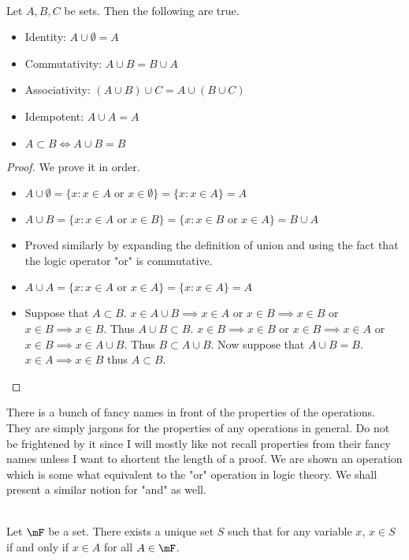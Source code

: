 \documentclass[a4paper]{article}
\begin{document}
\begin{lmm}{}{}\\
Let $A,B,C$ be sets. Then the following are true. 
\begin{itemize}
\item Identity: $A\cup\emptyset=A$
\item Commutativity: $A\cup B=B\cup A$
\item Associativity: $(A\cup B)\cup C=A\cup(B\cup C)$
\item Idempotent: $A\cup A=A$
\item $A\subset B\iff A\cup B=B$
\end{itemize}
\begin{proof} We prove it in order. 
\begin{itemize}
\item $A\cup\emptyset=\{x:x\in A\text{ or }x\in\emptyset\}=\{x:x\in A\}=A$
\item $A\cup B=\{x:x\in A\text{ or }x\in B\}=\{x:x\in B\text{ or }x\in A\}=B\cup A$
\item Proved similarly by expanding the definition of union and using the fact that the logic operator "or" is commutative. 
\item $A\cup A=\{x:x\in A\text{ or }x\in A\}=\{x:x\in A\}=A$
\item Suppose that $A\subset B$. $x\in A\cup B\implies x\in A$ or $x\in B\implies x\in B$ or $x\in B\implies x\in B$. Thus $A\cup B\subset B$. $x\in B\implies x\in B$ or $x\in B\implies x\in A$ or $x\in B\implies x\in A\cup B$. Thus $B\subset A\cup B$. Now suppose that $A\cup B=B$. $x\in A\implies x\in B$ thus $A\subset B$. 
\end{itemize}
\end{proof}
\end{lmm}

There is a bunch of fancy names in front of the properties of the operations. They are simply jargons for the properties of any operations in general. Do not be frightened by it since I will mostly like not recall properties from their fancy names unless I want to shortent the length of a proof. \linebreak\linebreak
We are shown an operation which is some what equivalent to the "or" operation in logic theory. We shall present a similar notion for "and" as well. 

\begin{prp}{}{}\\
Let $\mF$ be a set. There exists a unique set $S$ such that for any variable $x$, $x\in S$ if and only if $x\in A$ for all $A\in\mF$. 
\end{prp}
\end{document}
